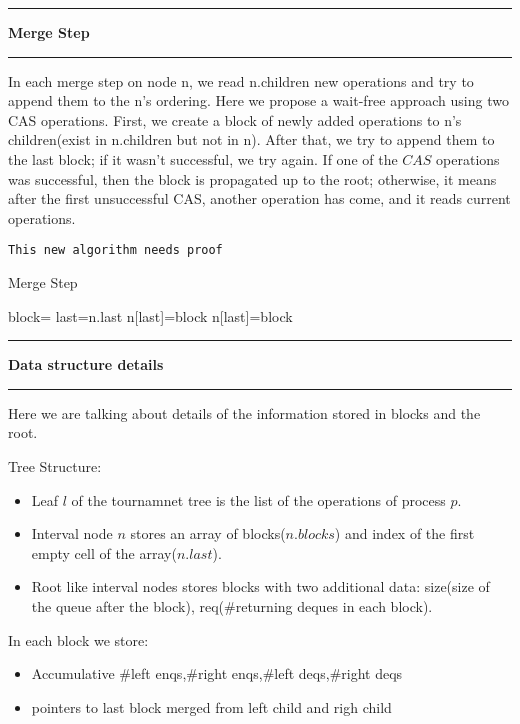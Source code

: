 \documentclass[10pt,table]{article}
\newcommand\question[1]{\vspace{1.2em}\hrule\textbf{ #1}\vspace{.5em}\hrule}
\theoremstyle{definition}
\begin{document}
 


\question{Merge Step}
In each merge step on node n, we read n.children new operations and try to append them to the n's ordering. Here we propose a wait-free approach using two CAS operations. First, we create a block of newly added operations to n's children(exist in n.children but not in n). After that, we try to append them to the last block; if it wasn't successful, we try again. If one of the $CAS$ operations was successful, then the block is propagated up to the root; otherwise, it means after the first unsuccessful CAS, another operation has come, and it reads current operations.

\texttt{This new algorithm needs proof}

\begin{algorithm}[h]
\caption{Merge Step}
\begin{algorithmic}[1]


\State block=
\State last=n.last 
n[last]=block
n[last]=block
\EndIf
\EndProcedure

\end{algorithmic}
\end{algorithm}


\question{Data structure details}
Here we are talking about details of the information stored in blocks and the root.

Tree Structure:
\begin{itemize}
  \item Leaf $l$ of the tournamnet tree is the list of the operations of process $p$.
  \item Interval node $n$ stores an array of blocks($n.blocks$) and index of the first empty cell of the array($n.last$).
  \item Root like interval nodes stores blocks with two additional data: size(size of the queue after the block), req($\#$returning deques in each block).
\end{itemize}


In each block we store:
\begin{itemize}
  \item Accumulative $\#$left enqs,$\#$right enqs,$\#$left deqs,$\#$right deqs
  \item pointers to last block merged from left child and righ child
\end{itemize}
\end{document}
